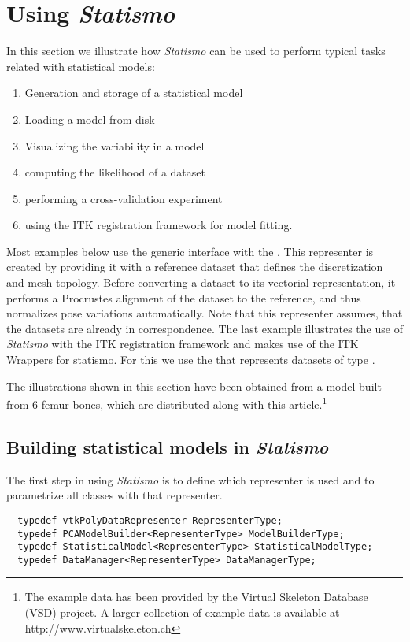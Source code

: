 \documentclass{InsightArticle}
\newcommand{\Statismo}{\emph{Statismo}\xspace}
\begin{document}
\section{Using \Statismo}
In this section we illustrate how \Statismo can be used to perform typical tasks related with statistical models:
\begin{enumerate}
  \item Generation and storage of a statistical model
  \item Loading a model from disk
  \item Visualizing the variability in  a model
  \item computing the likelihood of a dataset
  \item performing a cross-validation experiment
  \item using the ITK registration framework for model fitting. 
\end{enumerate}
Most examples below use  the generic
interface with the . This representer is
created by providing it with a reference dataset that defines the
discretization and mesh topology. Before converting a dataset to its
vectorial representation, it performs a Procrustes alignment
\cite{horn_closed-form_1987} of the dataset to the reference, and thus normalizes pose
variations automatically. Note that this representer assumes, that the
datasets are already in correspondence.
The last example illustrates the use of \Statismo with the ITK
registration framework and makes use of the ITK Wrappers for
statismo. For this we use the  that represents datasets
of type . 

The illustrations shown in this section have been obtained from a model built from 6 femur bones, 
which are distributed along with this article.\footnote{The example data has been provided by the Virtual Skeleton Database (VSD) project. A larger collection of example data is available at http://www.virtualskeleton.ch}




\subsection{Building statistical models in \Statismo}

The first step in using \Statismo is to define which representer is used and to parametrize all classes with that 
representer. 
\begin{verbatim}
  typedef vtkPolyDataRepresenter RepresenterType;
  typedef PCAModelBuilder<RepresenterType> ModelBuilderType;
  typedef StatisticalModel<RepresenterType> StatisticalModelType;
  typedef DataManager<RepresenterType> DataManagerType;
\end{verbatim}
\end{document}
